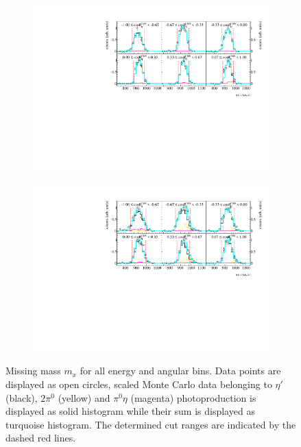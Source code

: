 \begin{figure}[H]
	\centering
	\begin{subfigure}{\linewidth}
		\includegraphics[width=\linewidth]{../figs/hydrogen/bin_cuts/mismcut_ebin1.pdf}
	\end{subfigure}
	
	\begin{subfigure}{\linewidth}
		\includegraphics[width=\linewidth]{../figs/hydrogen/bin_cuts/mismcut_ebin2.pdf}
	\end{subfigure}
\caption{Missing mass $m_x$ for all energy and angular bins. Data points are displayed as open circles, scaled Monte Carlo data belonging to $\eta'$ (black), $2\pi^0$ (yellow) and $\pi^0\eta$ (magenta) photoproduction is displayed as solid histogram while their sum is displayed as turquoise histogram. The determined cut ranges are indicated by the dashed red lines.}
\end{figure}
